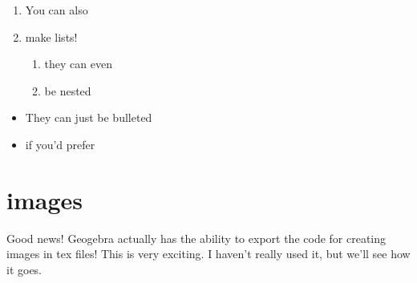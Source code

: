 \documentclass[11pt]{article}
\theoremstyle{definition}
\begin{document}
\begin{enumerate}
\item You can also 
\item make lists!
\begin{enumerate}
\item they can even
\item be nested
\end{enumerate}
\end{enumerate}

\begin{itemize}
\item They can just be bulleted
\item if you'd prefer
\end{itemize}

\section{images}

Good news! Geogebra actually has the ability to export the code for creating images in tex files! This is very exciting. I haven't really used it, but we'll see how it goes. 

\end{document}
